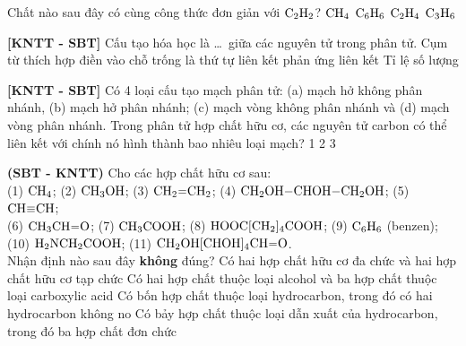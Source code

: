 \documentclass[12pt,a4paper]{article}
\begin{document}
\begin{ex}
Chất nào sau đây có cùng công thức đơn giản với $\ce{C2H2}$?
\choice
{$\ce{CH4}$}
{\True $\ce{C6H6}$}
{$\ce{C2H4}$}
{$\ce{C3H6}$}

\end{ex}

\begin{ex}
\textbf{[KNTT - SBT]} Cấu tạo hóa học là \dots\ giữa các nguyên tử trong phân tử. Cụm từ thích hợp điền vào chỗ trống là
\choice
{\True thứ tự liên kết}
{phản ứng}
{liên kết}
{Tỉ lệ số lượng}

\end{ex}

\begin{ex}
\textbf{[KNTT - SBT]} Có 4 loại cấu tạo mạch phân tử: (a) mạch hở không phân nhánh, (b) mạch hở phân nhánh; (c) mạch vòng không phân nhánh và (d) mạch vòng phân nhánh. Trong phân tử hợp chất hữu cơ, các nguyên tử carbon có thể liên kết với chính nó hình thành bao nhiêu loại mạch?
\choice
{1}
{2}
{3}
{}

\end{ex}

\begin{ex}
\textbf{(SBT - KNTT)} Cho các hợp chất hữu cơ sau:\\
(1) $\ce{CH4}$; \quad (2) $\ce{CH3OH}$; \quad (3) $\ce{CH2=CH2}$; \quad (4) $\ce{CH2OH-CHOH-CH2OH}$; \quad (5) $\ce{CH\bond{3}CH}$;\\
(6) $\ce{CH3CH=O}$; \quad (7) $\ce{CH3COOH}$; \quad (8) $\ce{HOOC[CH2]4COOH}$; \quad (9) $\ce{C6H6}$ (benzen);\\
(10) $\ce{H2NCH2COOH}$; \quad (11) $\ce{CH2OH[CHOH]4CH=O}$.\\
Nhận định nào sau đây \textbf{không} đúng?
\choice
{Có hai hợp chất hữu cơ đa chức và hai hợp chất hữu cơ tạp chức}
{\True Có hai hợp chất thuộc loại alcohol và ba hợp chất thuộc loại carboxylic acid}
{Có bốn hợp chất thuộc loại hydrocarbon, trong đó có hai hydrocarbon không no}
{Có bảy hợp chất thuộc loại dẫn xuất của hydrocarbon, trong đó ba hợp chất đơn chức}

\end{ex}
\end{document}
